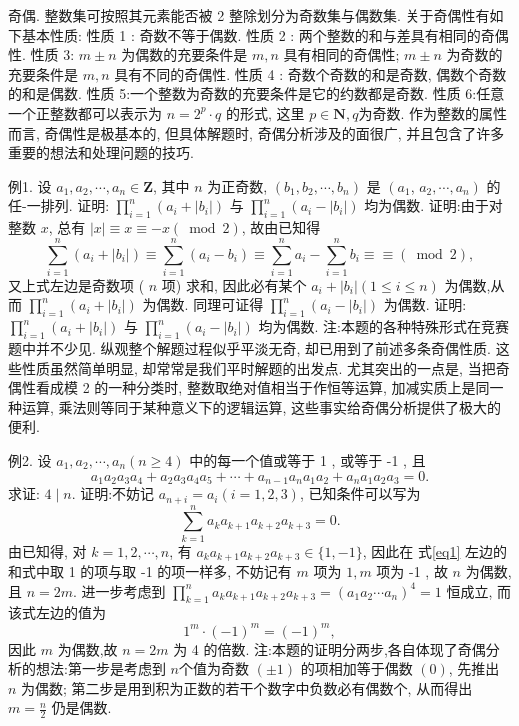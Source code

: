 
奇偶.
整数集可按照其元素能否被 2 整除划分为奇数集与偶数集.
关于奇偶性有如下基本性质:
性质 1 : 奇数不等于偶数.
性质 2 : 两个整数的和与差具有相同的奇偶性.
性质 3: $m \pm n$ 为偶数的充要条件是 $m, n$ 具有相同的奇偶性; $m \pm n$ 为奇数的充要条件是 $m, n$ 具有不同的奇偶性.
性质 4 : 奇数个奇数的和是奇数, 偶数个奇数的和是偶数.
性质 5:一个整数为奇数的充要条件是它的约数都是奇数.
性质 6:任意一个正整数都可以表示为 $n=2^p \cdot q$ 的形式, 这里 $p \in \mathbf{N}, q$为奇数.
作为整数的属性而言, 奇偶性是极基本的, 但具体解题时, 奇偶分析涉及的面很广, 并且包含了许多重要的想法和处理问题的技巧.



例1. 设 $a_1, a_2, \cdots, a_n \in \mathbf{Z}$, 其中 $n$ 为正奇数, $\left(b_1, b_2, \cdots, b_n\right)$ 是 $\left(a_1\right.$, $\left.a_2, \cdots, a_n\right)$ 的任-一排列.
证明: $\prod_{i=1}^n\left(a_i+\left|b_i\right|\right)$ 与 $\prod_{i=1}^n\left(a_i-\left|b_i\right|\right)$ 均为偶数.
证明:由于对整数 $x$, 总有 $|x| \equiv x \equiv-x(\bmod 2)$, 故由已知得
$$
\sum_{i=1}^n\left(a_i+\left|b_i\right|\right) \equiv \sum_{i=1}^n\left(a_i-b_i\right) \equiv \sum_{i=1}^n a_i-\sum_{i=1}^n b_i \equiv \equiv(\bmod 2),
$$
又上式左边是奇数项 ( $n$ 项) 求和, 因此必有某个 $a_i+\left|b_i\right|(1 \leqslant i \leqslant n)$ 为偶数,从而 $\prod_{i=1}^n\left(a_i+\left|b_i\right|\right)$ 为偶数.
同理可证得 $\prod_{i=1}^n\left(a_i-\left|b_i\right|\right)$ 为偶数.
证明: $\prod_{i=1}^n\left(a_i+\left|b_i\right|\right)$ 与 $\prod_{i=1}^n\left(a_i-\left|b_i\right|\right)$ 均为偶数.
注:本题的各种特殊形式在竞赛题中并不少见.
纵观整个解题过程似乎平淡无奇, 却已用到了前述多条奇偶性质.
这些性质虽然简单明显, 却常常是我们平时解题的出发点.
尤其突出的一点是, 当把奇偶性看成模 2 的一种分类时, 整数取绝对值相当于作恒等运算, 加减实质上是同一种运算, 乘法则等同于某种意义下的逻辑运算, 这些事实给奇偶分析提供了极大的便利.



例2. 设 $a_1, a_2, \cdots, a_n(n \geqslant 4)$ 中的每一个值或等于 1 , 或等于 -1 , 且
$$
a_1 a_2 a_3 a_4+a_2 a_3 a_4 a_5+\cdots+a_{n-1} a_n a_1 a_2+a_n a_1 a_2 a_3=0 .
$$
求证: $4 \mid n$. 
证明:不妨记 $a_{n+i}=a_i(i=1,2,3)$, 已知条件可以写为
$$
\sum_{k=1}^n a_k a_{k+1} a_{k+2} a_{k+3}=0 . \label{eq1}
$$
由已知得, 对 $k=1,2, \cdots, n$, 有 $a_k a_{k+1} a_{k+2} a_{k+3} \in\{1,-1\}$, 因此在 式\ref{eq1} 左边的和式中取 1 的项与取 -1 的项一样多, 不妨记有 $m$ 项为 $1, m$ 项为 -1 , 故 $n$ 为偶数,且 $n=2 m$.
进一步考虑到 $\prod_{k=1}^n a_k a_{k+1} a_{k+2} a_{k+3}=\left(a_1 a_2 \cdots a_n\right)^4=1$ 恒成立, 而该式左边的值为
$$
1^m \cdot(-1)^m=(-1)^m,
$$
因此 $m$ 为偶数,故 $n=2 m$ 为 4 的倍数.
注:本题的证明分两步,各自体现了奇偶分析的想法:第一步是考虑到 $n$个值为奇数 $( \pm 1)$ 的项相加等于偶数 $(0)$, 先推出 $n$ 为偶数; 第二步是用到积为正数的若干个数字中负数必有偶数个, 从而得出 $m=\frac{n}{2}$ 仍是偶数.



